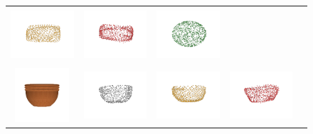 \documentclass[bachelor, nocolorlinks, printoneside]{seuthesis} %
\begin{document}
\begin{Appendix}{}
\begin{figure}[!h]
\begin{tabular}{c@{}c@{}c@{}c@{}c@{}}
            \includegraphics[width=0.18\columnwidth,height=2cm]{figs/supp_real_dataset/AE_label/pillow_68131b4f51579263f7b57f419ab2620_pred.png} &
            \includegraphics[width=0.18\columnwidth,height=2cm]{figs/supp_real_dataset/AE/pillow_68131b4f51579263f7b57f419ab2620_pred.png} &
            \includegraphics[width=0.18\columnwidth,height=2cm]{figs/supp_real_dataset/oracle/pillow_68131b4f51579263f7b57f419ab2620_oracle.png} \\
            \vspace{-5mm}
            \includegraphics[width=0.11\columnwidth,height=2cm]{figs/supp_real_dataset/Image/pot_490e2e25da735cfd3df324363ca0723f.png} &
            \includegraphics[width=0.18\columnwidth,height=2cm]{figs/supp_real_dataset/GT/pot_490e2e25da735cfd3df324363ca0723f_gt.png} &
            \includegraphics[width=0.18\columnwidth,height=2cm]{figs/supp_real_dataset/AE_label/pot_490e2e25da735cfd3df324363ca0723f_label.png} &
            \includegraphics[width=0.18\columnwidth,height=2cm]{figs/supp_real_dataset/AE/pot_490e2e25da735cfd3df324363ca0723f_pred.png} &

\end{tabular}
\end{figure}
\end{Appendix}
\end{document}
